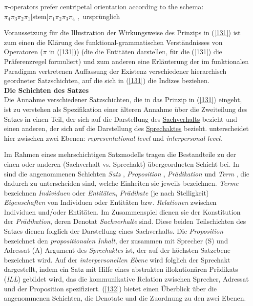 \begin{exe}
	\ex\label{131} 
	$\pi$-operators prefer centripetal orientation according to the schema:\\
 	$\pi_{\textrm{4}}\pi_{\textrm{3}}\pi_{\textrm{2}}\pi_{\textrm{1}}\textrm{[stem]}\pi_{\textrm{1}}\pi_{\textrm{2}}\pi_{\textrm{3}}\pi_{\textrm{4}}$ 
 	\newline
 	\hbox{}\hfill\hbox{\citet[414]{Dik1997}, ursprünglich \citet[141]{Hengeveld1989}}
\end{exe}
Voraussetzung für die Illustration der Wirkungsweise des Prinzips in (\ref{131}) ist zum einen die Klärung des funktional-grammatischen Verständnisses von Ope\-ratoren ($\pi$ in (\ref{131}))  (die die Entitäten darstellen, für die (\ref{131}) die Präferenzregel formuliert) und zum anderen eine Erläuterung der im funktionalen Paradigma vertretenen Auffassung der Existenz verschiedener hierarchisch geordneter Satz\-\glq schichten\grq {}, auf die sich in (\ref{131}) die Indizes beziehen.\\
\newline
\noindent
\textbf{Die Schichten des Satzes}\\
\noindent
Die Annahme verschiedener Satzschichten, die in das Prinzip in (\ref{131}) eingeht, ist zu verstehen als Spezifikation einer älteren Annahme über die Zweiteilung des Satzes in einen Teil, der sich auf die Darstellung des \underline{Sachverhalts} bezieht und einen anderen, der sich auf die Darstellung des \underline{Sprechaktes} bezieht. \citet{Hengeveld1989} unterscheidet hier zwischen zwei Ebenen: \textit{representational level}  und  \textit{interpersonal level}.
 
Im Rahmen eines mehrschichtigen Satzmodells tragen die Bestandteile zu der einen oder anderen (Sachverhalt vs. Sprechakt) übergeordneten Schicht bei. In \citet[4]{Hengeveld1990} sind die angenommenen Schichten \textit{Satz} , \textit{Proposition} , \textit{Prädikation}  und \textit{Term} , die dadurch zu unterscheiden sind, welche Einheiten sie jeweils bezeichnen. \textit{Terme} bezeichnen \textit{Individuen} oder \textit{Entitäten}, \textit{Prädikate} (je nach Stelligkeit) \textit{Eigenschaften} von Individuen oder Entitäten bzw. \textit{Relationen} zwischen Individuen und/oder Entitäten. Im Zusammenspiel dienen sie der Konstitution der \textit{Prädikation}, deren Denotat \textit{Sachverhalte} sind. Diese beiden Teilschichten des Satzes dienen folglich der Darstellung eines Sachverhalts. Die \textit{Proposition} be\-zeichnet den \textit{propositionalen Inhalt}, der zusammen mit Sprecher (S) und Adressat (A) Argument des \textit{Sprechaktes} ist, der auf der höchsten Satzebene bezeichnet wird. Auf der \textit{interpersonellen Ebene} wird folglich der Sprechakt dargestellt, indem ein Satz mit Hilfe eines abstrakten illokutionären Prädikats (\textit{ILL}) gebildet wird, das die kommunikative Relation zwischen Sprecher, Adressat und der Proposition spezifiziert. (\ref{132}) bietet einen Überblick über die angenommenen Schichten, die Denotate und die Zuordnung zu den zwei Ebenen.

